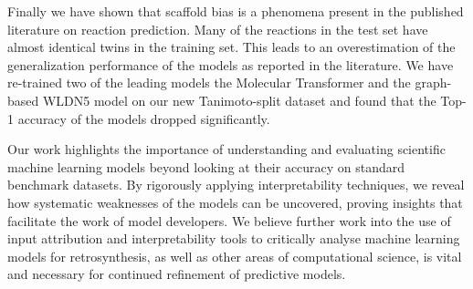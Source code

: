 Finally we have shown that scaffold bias is a phenomena present in the published literature on reaction prediction. Many of the reactions in the test set have almost identical twins in the training set. This leads to an overestimation of the generalization performance of the models as reported in the literature. We have re-trained two of the leading models the Molecular Transformer and the graph-based WLDN5 model on our new Tanimoto-split dataset and found that the Top-1 accuracy of the models dropped significantly.

Our work highlights the importance of understanding and evaluating scientific machine learning models beyond looking at their accuracy on standard benchmark datasets. By rigorously applying interpretability techniques, we reveal how systematic weaknesses of the models can be uncovered, proving insights that facilitate the work of model developers. We believe further work into the use of input attribution and interpretability tools to critically analyse machine learning models for retrosynthesis, as well as other areas of computational science, is vital and necessary for continued refinement of predictive models.




